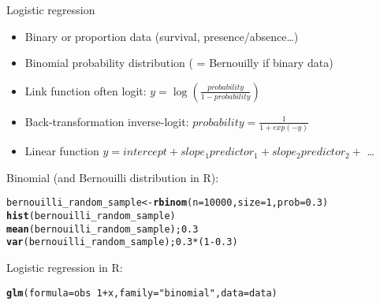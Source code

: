 \documentclass[10pt]{beamer}\usepackage[]{graphicx}\usepackage[]{color}
\makeatletter
\newcommand{\hlnum}[1]{\textcolor[rgb]{0.686,0.059,0.569}{#1}}%
\newcommand{\hlstr}[1]{\textcolor[rgb]{0.192,0.494,0.8}{#1}}%
\newcommand{\hlopt}[1]{\textcolor[rgb]{0,0,0}{#1}}%
\newcommand{\hlstd}[1]{\textcolor[rgb]{0.345,0.345,0.345}{#1}}%
\newcommand{\hlkwb}[1]{\textcolor[rgb]{0.69,0.353,0.396}{#1}}%
\newcommand{\hlkwc}[1]{\textcolor[rgb]{0.333,0.667,0.333}{#1}}%
\newcommand{\hlkwd}[1]{\textcolor[rgb]{0.737,0.353,0.396}{\textbf{#1}}}%
\newenvironment{kframe}{%
 \def\at@end@of@kframe{}%
 \ifinner\ifhmode%
  \def\at@end@of@kframe{\end{minipage}}%
  \begin{minipage}{\columnwidth}%
 \fi\fi%
 \def\FrameCommand##1{\hskip\@totalleftmargin \hskip-\fboxsep
 \colorbox{shadecolor}{##1}\hskip-\fboxsep
     \hskip-\linewidth \hskip-\@totalleftmargin \hskip\columnwidth}%
 \MakeFramed {\advance\hsize-\width
   \@totalleftmargin\z@ \linewidth\hsize
   \@setminipage}}%
 {\par\unskip\endMakeFramed%
 \at@end@of@kframe}
\newenvironment{knitrout}{}{} %
\makeatother
\begin{document}
\begin{frame}[fragile]{Logistic regression}
  \begin{itemize}
    \item Binary or proportion data (survival, presence/absence\dots)
    \item Binomial probability distribution ( = Bernouilly if binary data)
    \item Link function often logit: $y=\log(\frac{probability}{1-probability})$
    \item Back-transformation inverse-logit: $probability = \frac{1}{1 + exp(-y)}$
    \item Linear function $y = intercept + slope_1 predictor_1 + slope_2 predictor_2 +$ \dots
  \end{itemize}

\pause
  Binomial (and Bernouilli distribution in R):
\begin{knitrout}\small
{}\color{fgcolor}\begin{kframe}
\begin{alltt}
  \hlstd{bernouilli_random_sample} \hlkwb{<-} \hlkwd{rbinom}\hlstd{(}\hlkwc{n} \hlstd{=} \hlnum{10000}\hlstd{,} \hlkwc{size} \hlstd{=} \hlnum{1}\hlstd{,} \hlkwc{prob} \hlstd{=} \hlnum{0.3}\hlstd{)}
  \hlkwd{hist}\hlstd{(bernouilli_random_sample)}
  \hlkwd{mean}\hlstd{(bernouilli_random_sample);} \hlnum{0.3}
  \hlkwd{var}\hlstd{(bernouilli_random_sample);} \hlnum{0.3}\hlopt{*}\hlstd{(}\hlnum{1}\hlopt{-}\hlnum{0.3}\hlstd{)}
\end{alltt}
\end{kframe}
\end{knitrout}
  \pause
  Logistic regression in R:
\begin{knitrout}\small
{}\color{fgcolor}\begin{kframe}
\begin{alltt}
  \hlkwd{glm}\hlstd{(}\hlkwc{formula} \hlstd{= obs} \hlopt{~} \hlnum{1} \hlopt{+} \hlstd{x,} \hlkwc{family} \hlstd{=} \hlstr{"binomial"}\hlstd{,} \hlkwc{data}\hlstd{=data)}
\end{alltt}
\end{kframe}
\end{knitrout}
  
\end{frame}
\end{document}
